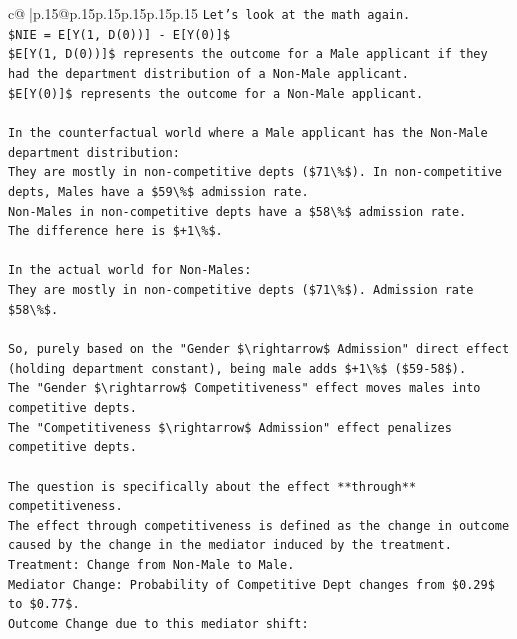 \documentclass{article}
\begin{document}
{\begin{supertabular}{c@{$\;$}|p{.15\linewidth}@{}p{.15\linewidth}p{.15\linewidth}p{.15\linewidth}p{.15\linewidth}p{.15\linewidth}}
{{{\texttt{Let's look at the math again.} \\
\texttt{\$NIE = E{[}Y(1, D(0)){]} {-} E{[}Y(0){]}\$} \\
\texttt{\$E{[}Y(1, D(0)){]}\$ represents the outcome for a Male applicant if they had the department distribution of a Non{-}Male applicant.} \\
\texttt{\$E{[}Y(0){]}\$ represents the outcome for a Non{-}Male applicant.} \\
\\ 
\texttt{In the counterfactual world where a Male applicant has the Non{-}Male department distribution:} \\
\texttt{They are mostly in non{-}competitive depts (\$71\textbackslash{}\%\$). In non{-}competitive depts, Males have a \$59\textbackslash{}\%\$ admission rate.} \\
\texttt{Non{-}Males in non{-}competitive depts have a \$58\textbackslash{}\%\$ admission rate.} \\
\texttt{The difference here is \$+1\textbackslash{}\%\$.} \\
\\ 
\texttt{In the actual world for Non{-}Males:} \\
\texttt{They are mostly in non{-}competitive depts (\$71\textbackslash{}\%\$). Admission rate \$58\textbackslash{}\%\$.} \\
\\ 
\texttt{So, purely based on the "Gender \$\textbackslash{}rightarrow\$ Admission" direct effect (holding department constant), being male adds \$+1\textbackslash{}\%\$ (\$59{-}58\$).} \\
\texttt{The "Gender \$\textbackslash{}rightarrow\$ Competitiveness" effect moves males into competitive depts.} \\
\texttt{The "Competitiveness \$\textbackslash{}rightarrow\$ Admission" effect penalizes competitive depts.} \\
\\ 
\texttt{The question is specifically about the effect **through** competitiveness.} \\
\texttt{The effect through competitiveness is defined as the change in outcome caused by the change in the mediator induced by the treatment.} \\
\texttt{Treatment: Change from Non{-}Male to Male.} \\
\texttt{Mediator Change: Probability of Competitive Dept changes from \$0.29\$ to \$0.77\$.} \\
\texttt{Outcome Change due to this mediator shift:} \\
}}}
\end{supertabular}}
\end{document}
